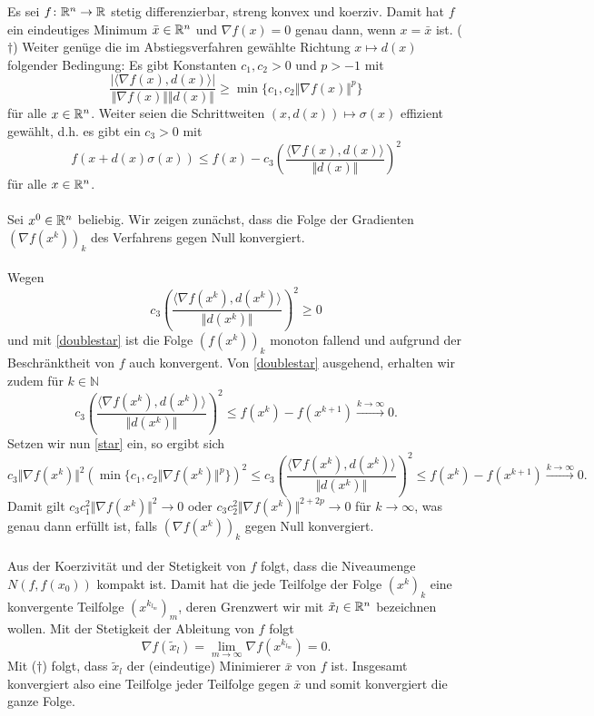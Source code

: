 
Es sei $f\colon\mathbb{R}^n\to\mathbb{R}$ stetig differenzierbar, streng konvex und koerziv. 
Damit hat $f$ ein eindeutiges Minimum $\bar x\in\mathbb{R}^n$ und $\nabla f(x)=0$ genau
dann, wenn $x=\bar x$ ist. ($\dagger$)
Weiter genüge die im Abstiegsverfahren gewählte Richtung $x\mapsto d(x)$ 
folgender Bedingung: Es gibt Konstanten $c_1,c_2>0$ und $p>-1$ mit
\begin{displaymath}\label{star}
 \frac{|\langle \nabla f(x),d(x)\rangle|}{\Vert\nabla f(x)\Vert\Vert d(x)\Vert}\geq\min\{c_1,c_2\Vert \nabla f(x)\Vert^p\}\tag{$\star$}
\end{displaymath}
für alle $x\in\mathbb{R}^n$. Weiter seien die Schrittweiten $(x,d(x))\mapsto \sigma(x)$ 
effizient gewählt, d.h. es gibt ein $c_3>0$ mit
\begin{displaymath}\label{doublestar}
 f(x+d(x)\sigma(x))\leq f(x)-c_3\left(\frac{\langle\nabla f(x),d(x)\rangle}{\Vert d(x)\Vert}\right)^2 \tag{$\star\star$}
\end{displaymath}
für alle $x\in\mathbb{R}^n$.
\\ \\
Sei $x^0\in\mathbb{R}^n$ beliebig. Wir zeigen zunächst, dass die Folge der Gradienten
$(\nabla f(x^k))_k$ des  Verfahrens gegen Null konvergiert. 
\\\\
Wegen 
\begin{displaymath}
 c_3\left(\frac{\langle\nabla f(x^k),d(x^k)\rangle}{\Vert d(x^k)\Vert}\right)^2\geq0
\end{displaymath}
und  mit \eqref{doublestar} ist die Folge $(f(x^k))_k$ monoton fallend und aufgrund der Beschränktheit von $f$ auch konvergent.
Von \eqref{doublestar} ausgehend, erhalten wir zudem für $k\in\mathbb{N}$
\begin{displaymath}
 c_3\left(\frac{\langle\nabla f(x^k),d(x^k)\rangle}{\Vert d(x^k)\Vert}\right)^2 \leq f(x^k)-f(x^{k+1}) \overset{k\to\infty}{\to} 0.
\end{displaymath}
Setzen wir nun \eqref{star} ein, so ergibt sich
\begin{displaymath}
 c_3\Vert\nabla f(x^k)\Vert^2 (\min\{c_1,c_2\Vert \nabla f(x^k)\Vert^p\})^2\leq c_3\left(\frac{\langle\nabla f(x^k),d(x^k)\rangle}{\Vert d(x^k)\Vert}\right)^2 \leq f(x^k)-f(x^{k+1}) \overset{k\to\infty}{\to} 0.
\end{displaymath}
Damit gilt $c_3c_1^2\Vert\nabla f(x^k)\Vert^2\to 0$ oder $c_3c_2^2\Vert\nabla f(x^k)\Vert^{2+2p}\to 0$ für $k\to\infty$,
was genau dann erfüllt ist, falls $(\nabla f(x^k))_k$ gegen Null konvergiert.
\\\\
Aus der Koerzivität und der Stetigkeit von $f$ folgt, dass die Niveaumenge $N(f,f(x_0))$ kompakt ist.
Damit hat die jede Teilfolge der Folge $(x^k)_k$ eine konvergente Teilfolge $(x^{k_{l_m}})_m$, deren Grenzwert wir mit $\tilde x_l\in\mathbb{R}^n$
bezeichnen wollen. Mit der Stetigkeit der Ableitung von $f$ folgt 
\begin{displaymath}
 \nabla f(\tilde x_l)=\lim_{m\to\infty}\nabla f(x^{k_{l_m}})=0.
\end{displaymath}
Mit ($\dagger$) folgt, dass $\tilde x_l$ der (eindeutige) Minimierer $\bar x$ von $f$ ist. Insgesamt konvergiert also
eine Teilfolge jeder Teilfolge gegen $\bar x$ und somit konvergiert die ganze Folge.